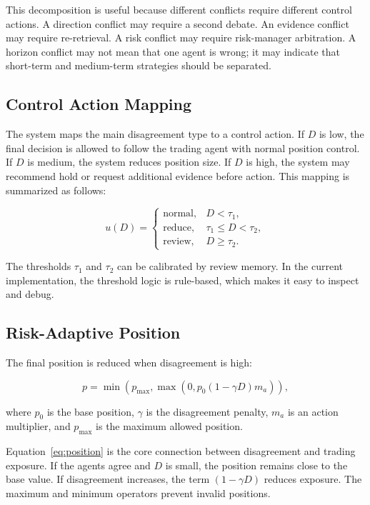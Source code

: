 \documentclass[14pt,a4paper]{extarticle}
\begin{document}
This decomposition is useful because different conflicts require different control actions. A direction conflict may require a second debate. An evidence conflict may require re-retrieval. A risk conflict may require risk-manager arbitration. A horizon conflict may not mean that one agent is wrong; it may indicate that short-term and medium-term strategies should be separated.

\subsection{Control Action Mapping}

The system maps the main disagreement type to a control action. If $D$ is low, the final decision is allowed to follow the trading agent with normal position control. If $D$ is medium, the system reduces position size. If $D$ is high, the system may recommend hold or request additional evidence before action. This mapping is summarized as follows:

\begin{equation}
u(D)=
\begin{cases}
\mathrm{normal}, & D < \tau_1,\\
\mathrm{reduce}, & \tau_1 \leq D < \tau_2,\\
\mathrm{review}, & D \geq \tau_2.
\end{cases}
\label{eq:control-action}
\end{equation}

The thresholds $\tau_1$ and $\tau_2$ can be calibrated by review memory. In the current implementation, the threshold logic is rule-based, which makes it easy to inspect and debug.

\subsection{Risk-Adaptive Position}

The final position is reduced when disagreement is high:

\begin{equation}
p=\min\left(p_{\max},\max\left(0,p_0(1-\gamma D)m_a\right)\right),
\label{eq:position}
\end{equation}

where $p_0$ is the base position, $\gamma$ is the disagreement penalty, $m_a$ is an action multiplier, and $p_{\max}$ is the maximum allowed position.

Equation~\ref{eq:position} is the core connection between disagreement and trading exposure. If the agents agree and $D$ is small, the position remains close to the base value. If disagreement increases, the term $(1-\gamma D)$ reduces exposure. The maximum and minimum operators prevent invalid positions.
\end{document}
